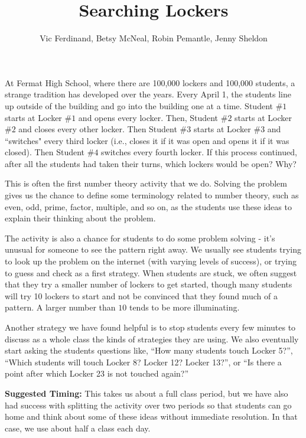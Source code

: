 \documentclass{ximera}
\title{Searching Lockers}
\author{Vic Ferdinand, Betsy McNeal, Robin Pemantle, Jenny Sheldon}
\begin{document}
\begin{abstract} \end{abstract}
\maketitle


\begin{problem}
At Fermat High School, where there are 100,000 lockers and 100,000 students, a strange tradition has developed over the years.  Every April 1, the students line up outside of the building and go into the building one at a time.  Student $\#1$ starts at Locker $\#1$ and opens every locker.  Then, Student $\#2$ starts at Locker $\#2$  and closes every other locker.  Then Student $\#3$ starts at Locker $\#3$ and ``switches" every third locker (i.e., closes it if it was open and opens it if it was closed).  Then Student $\#4$ switches every fourth locker.  If this process continued, after all the students had taken their turns, which lockers would be open?  Why?
\end{problem}
\newpage

\begin{instructorNotes}
This is often the first number theory activity that we do.  Solving the problem gives us the chance to define some terminology related to number theory, such as even, odd, prime, factor, multiple, and so on, as the students use these ideas to explain their thinking about the problem.

The activity is also a chance for students to do some problem solving - it's unusual for someone to see the pattern right away.  We usually see students trying to look up the problem on the internet (with varying levels of success), or trying to guess and check as a first strategy.  When students are stuck, we often suggest that they try a smaller number of lockers to get started, though many students will try 10 lockers to start and not be convinced that they found much of a pattern.  A larger number than $10$ tends to be more illuminating.

Another strategy we have found helpful is to stop students every few minutes to discuss as a whole class the kinds of strategies they are using.  We also eventually start asking the students questions like, ``How many students touch Locker 5?'', ``Which students will touch Locker 8? Locker 12?  Locker 13?'', or ``Is there a point after which Locker 23 is not touched again?''

{\bf Suggested Timing:} This takes us about a full class period, but we have also had success with splitting the activity over two periods so that students can go home and think about some of these ideas without immediate resolution.  In that case, we use about half a class each day.
\end{instructorNotes}
\end{document}
